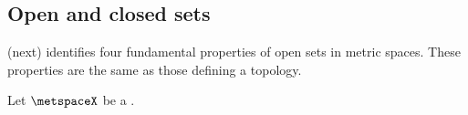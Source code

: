 \subsection{Open and closed sets}
 (next) identifies four fundamental properties of open sets in
metric spaces.
These properties are the same as those defining a topology.
\begin{corollary}
\label{cor:ms_open}
Let $\metspaceX$ be a  .
\end{corollary}
